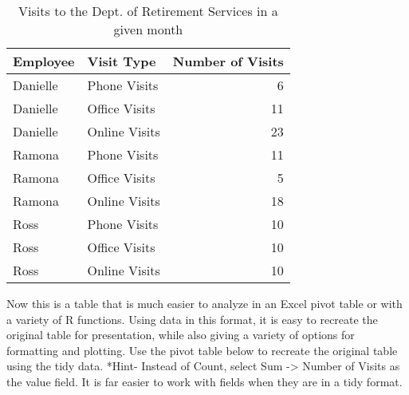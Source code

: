 \documentclass[]{book}
\newenvironment{Shaded}{\begin{snugshade}}{\end{snugshade}}
\newcommand{\CommentTok}[1]{\textcolor[rgb]{0.56,0.35,0.01}{\textit{#1}}}
\newcommand{\DataTypeTok}[1]{\textcolor[rgb]{0.13,0.29,0.53}{#1}}
\newcommand{\KeywordTok}[1]{\textcolor[rgb]{0.13,0.29,0.53}{\textbf{#1}}}
\newcommand{\NormalTok}[1]{#1}
\newcommand{\OperatorTok}[1]{\textcolor[rgb]{0.81,0.36,0.00}{\textbf{#1}}}
\newcommand{\StringTok}[1]{\textcolor[rgb]{0.31,0.60,0.02}{#1}}
\begin{document}
\begin{Shaded}
\end{Shaded}

\begin{table}

\caption{\label{tab:unnamed-chunk-4}Visits to the Dept. of Retirement Services in a given month}
\centering
\begin{tabular}[t]{l|l|r}
\hline
Employee & Visit Type & Number of Visits\\
\hline
Danielle & Phone Visits & 6\\
\hline
Danielle & Office Visits & 11\\
\hline
Danielle & Online Visits & 23\\
\hline
Ramona & Phone Visits & 11\\
\hline
Ramona & Office Visits & 5\\
\hline
Ramona & Online Visits & 18\\
\hline
Ross & Phone Visits & 10\\
\hline
Ross & Office Visits & 10\\
\hline
Ross & Online Visits & 10\\
\hline
\end{tabular}
\end{table}

Now this is a table that is much easier to analyze in an Excel pivot table or with a variety of R functions. Using data in this format, it is easy to recreate the original table for presentation, while also giving a variety of options for formatting and plotting. Use the pivot table below to recreate the original table using the tidy data. *Hint- Instead of Count, select Sum -\textgreater{} Number of Visits as the value field. It is far easier to work with fields when they are in a tidy format.
\end{document}
